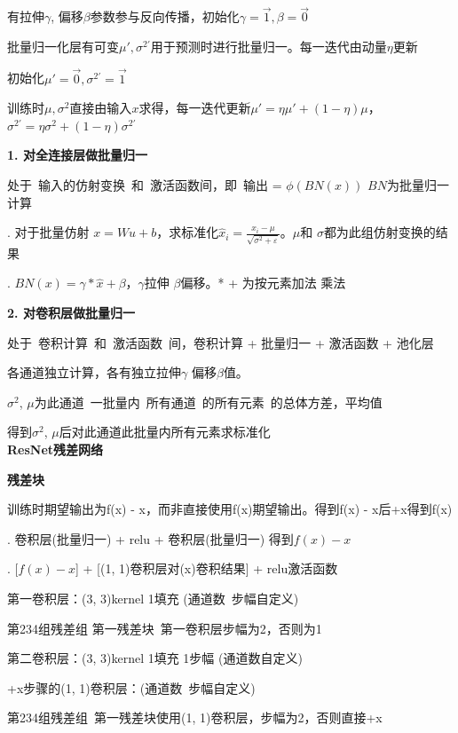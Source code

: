 \documentclass[UTF8]{ctexart}
\begin{document}
  有拉伸$\gamma$, 偏移$\beta$参数参与反向传播，初始化$\gamma = \vec{1}, \beta = \vec{0}$

  批量归一化层有可变$\mu', \sigma^{2'}$用于预测时进行批量归一。每一迭代由动量$\eta$更新
  
  \quad 初始化$\mu' = \vec{0}, \sigma^{2'} = \vec{1}$

  \quad 训练时$\mu, \sigma^2$直接由输入$x$求得，每一迭代更新$\mu' = \eta\mu' + (1 - \eta)\mu$，$\sigma^{2'} = \eta\sigma^2 + (1 - \eta)\sigma^{2'}$

  \textbf{1. 对全连接层做批量归一}

  \quad 处于\ 输入的仿射变换\ 和\ 激活函数间，即\ 输出 = $\phi (BN(x))$ $BN$为批量归一计算

  . 对于批量仿射 $x = Wu + b$，求标准化$\hat{x}_i = \frac{{x_i} - \mu}{\sqrt{\sigma^2 + \varepsilon }}$。$\mu $和 $\sigma$都为此组仿射变换的结果

  . $BN(x) = \gamma * \hat{x} + \beta $，$\gamma$拉伸 $\beta$偏移。* + 为按元素加法 乘法

  \textbf{2. 对卷积层做批量归一}

  \quad 处于\ 卷积计算\ 和\ 激活函数\ 间，卷积计算 + 批量归一 + 激活函数 + 池化层

  \quad 各通道独立计算，各有独立拉伸$\gamma$ 偏移$\beta$值。
  
  \quad $\sigma^2$, $\mu$为此通道\ 一批量内\ 所有通道\ 的所有元素\ 的总体方差，平均值

  \quad 得到$\sigma^2$, $\mu$后对此通道此批量内所有元素求标准化\\
\textbf{ResNet残差网络}

  \textbf{残差块}

  \quad 训练时期望输出为f(x) - x，而非直接使用f(x)期望输出。得到f(x) - x后+x得到f(x)

  . 卷积层(批量归一) + relu + 卷积层(批量归一) 得到$f(x) - x$
  
  . [$f(x) - x$] + [(1, 1)卷积层对(x)卷积结果] + relu激活函数
  
  \quad \quad 第一卷积层：(3, 3)kernel 1填充 (通道数\ 步幅自定义)

  \quad \quad \quad 第234组残差组 第一残差块\ 第一卷积层步幅为2，否则为1

  \quad \quad 第二卷积层：(3, 3)kernel 1填充 1步幅 (通道数自定义)

  \quad \quad +x步骤的(1, 1)卷积层：(通道数\ 步幅自定义) 

  \quad \quad \quad 第234组残差组\ 第一残差块使用(1, 1)卷积层，步幅为2，否则直接+x
\end{document}
